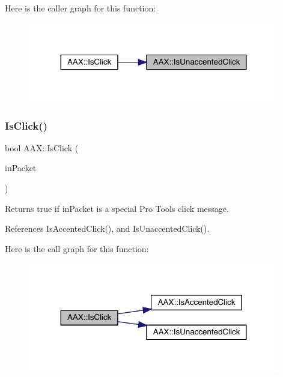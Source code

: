 Here is the caller graph for this function\+:
\nopagebreak
\begin{figure}[H]
\begin{center}
\leavevmode
\includegraphics[width=311pt]{a00852_a4f915a56cb150638f036cb7ed33facd8_icgraph}
\end{center}
\end{figure}
\mbox{\label{a00852_a8f9544e49b4473862e0c1382f6963ce7}} 
\subsubsection{\texorpdfstring{IsClick()}{IsClick()}}
{\footnotesize\ttfamily bool A\+A\+X\+::\+Is\+Click (\begin{DoxyParamCaption}\item[{const \mbox{\hyperlink{a01429}{A\+A\+X\+\_\+\+C\+Midi\+Packet}} $\ast$}]{in\+Packet }\end{DoxyParamCaption})\hspace{0.3cm}{\ttfamily [inline]}}



Returns true if {\ttfamily in\+Packet} is a special Pro Tools click message. 



References Is\+Accented\+Click(), and Is\+Unaccented\+Click().

Here is the call graph for this function\+:
\nopagebreak
\begin{figure}[H]
\begin{center}
\leavevmode
\includegraphics[width=311pt]{a00852_a8f9544e49b4473862e0c1382f6963ce7_cgraph}
\end{center}
\end{figure}
\mbox{\label{a00852_a6615318d686a57585ba69565f8e6a99b}} 
